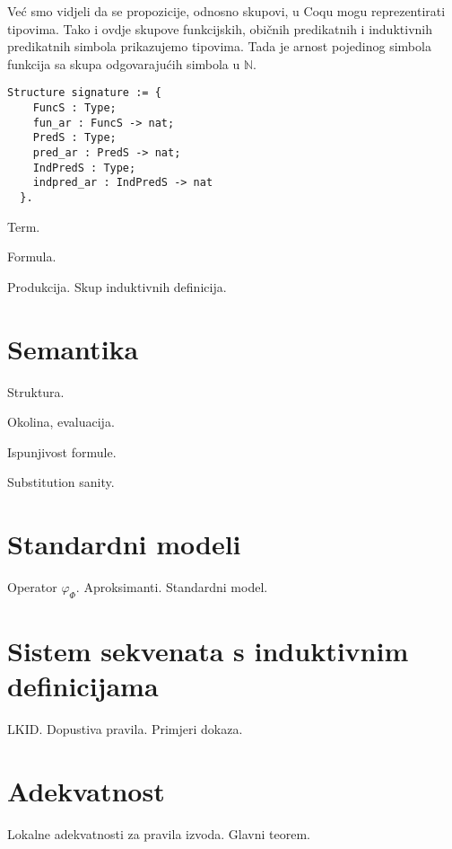 Već smo vidjeli da se propozicije, odnosno skupovi, u Coqu mogu reprezentirati tipovima.
Tako i ovdje skupove funkcijskih, običnih predikatnih i induktivnih predikatnih
simbola prikazujemo tipovima.
Tada je arnost pojedinog simbola funkcija sa skupa odgovarajućih simbola u \(\mathbb{N}\).
\begin{verbatim}
Structure signature := {
    FuncS : Type;
    fun_ar : FuncS -> nat;
    PredS : Type;
    pred_ar : PredS -> nat;
    IndPredS : Type;
    indpred_ar : IndPredS -> nat
  }.
\end{verbatim}

\begin{definition}
  Term.
\end{definition}

\begin{definition}
  Formula.
\end{definition}

\begin{definition}
  Produkcija. Skup induktivnih definicija.
\end{definition}

\section{Semantika}\label{sec:semantika}
\begin{definition}
  Struktura.
\end{definition}

\begin{definition}
  Okolina, evaluacija.
\end{definition}

\begin{definition}
  Ispunjivost formule.
\end{definition}

\begin{lemma}
  Substitution sanity.
\end{lemma}

\section{Standardni modeli}\label{sec:standardni-modeli}
Operator \(\varphi_{\Phi}\). Aproksimanti. Standardni model.

\section{Sistem sekvenata s induktivnim definicijama}\label{sec:sistem-sekvenata}
LKID. Dopustiva pravila. Primjeri dokaza.

\section{Adekvatnost}\label{sec:adekvatnost}
Lokalne adekvatnosti za pravila izvoda. Glavni teorem.

